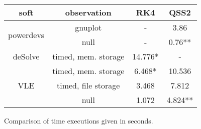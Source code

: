\documentclass{article}
\theoremstyle{remark}
\begin{document}
\begin{figure}
\begin{center}
\begin{tabular}{|c|c|c|c|}
\hline
soft                      & observation         & RK4     & QSS2  \\\hline\hline
\multirow{2}{*}{powerdevs}& gnuplot             &  -      & 3.86  \\ \cline{2-4}
                          & null                &  -      & 0.76**  \\ \hline
deSolve                   & timed, mem. storage &  14.776* & -     \\ \hline
\multirow{3}{*}{VLE}      & timed, mem. storage &  6.468*  & 10.536\\\cline{2-4} 
                          & timed, file storage &  3.468  & 7.812 \\ \cline{2-4}
                          & null                &  1.072  & 4.824** \\ \hline
\end{tabular}
\caption{Comparison of time executions given in seconds.}
\end{center}
\end{figure}

%
%
\end{document}
